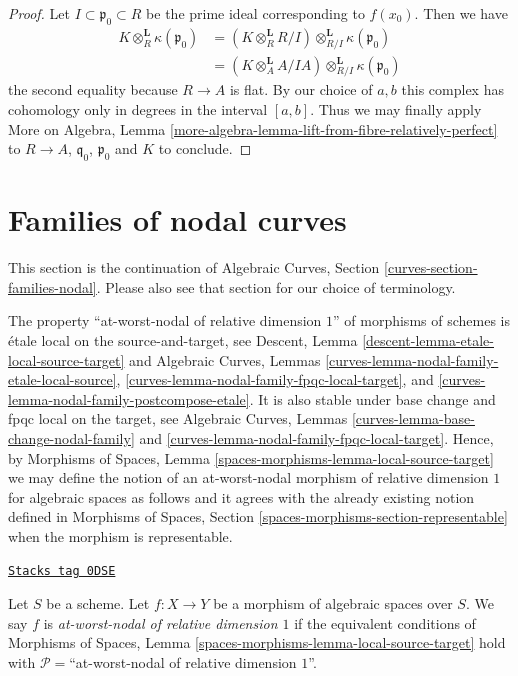 \begin{proof}
\medskip\noindent
Let $I \subset \mathfrak p_0 \subset R$ be the prime
ideal corresponding to $f(x_0)$. Then we have
\begin{align*}
K \otimes_R^\mathbf{L} \kappa(\mathfrak p_0)
& =
(K \otimes_R^\mathbf{L} R/I) \otimes_{R/I}^\mathbf{L}
\kappa(\mathfrak p_0) \\
& =
(K \otimes_A^\mathbf{L} A/IA) \otimes_{R/I}^\mathbf{L} \kappa(\mathfrak p_0)
\end{align*}
the second equality because $R \to A$ is flat.
By our choice of $a, b$ this complex has cohomology
only in degrees in the interval $[a, b]$.
Thus we may finally apply
More on Algebra, Lemma
\ref{more-algebra-lemma-lift-from-fibre-relatively-perfect}
to $R \to A$, $\mathfrak q_0$, $\mathfrak p_0$ and $K$
to conclude.
\end{proof}

\section{Families of nodal curves}
\label{spaces-more-morphisms-section-families-nodal}
This section is the continuation of
Algebraic Curves, Section \ref{curves-section-families-nodal}.
Please also see that section for our choice
of terminology.

\medskip\noindent
The property ``at-worst-nodal of relative dimension $1$''
of morphisms of schemes is \'etale local on the source-and-target, see
Descent, Lemma \ref{descent-lemma-etale-local-source-target}
and
Algebraic Curves, Lemmas \ref{curves-lemma-nodal-family-etale-local-source},
\ref{curves-lemma-nodal-family-fpqc-local-target}, and
\ref{curves-lemma-nodal-family-postcompose-etale}.
It is also stable under base change and fpqc local on the target, see
Algebraic Curves, Lemmas \ref{curves-lemma-base-change-nodal-family} and
\ref{curves-lemma-nodal-family-fpqc-local-target}. Hence, by
Morphisms of Spaces, Lemma \ref{spaces-morphisms-lemma-local-source-target}
we may define the notion of an at-worst-nodal morphism of relative
dimension $1$ for algebraic spaces as follows and it agrees with the
already existing notion defined in
Morphisms of Spaces, Section \ref{spaces-morphisms-section-representable}
when the morphism is representable.

\begin{definition}
\label{spaces-more-morphisms-definition-nodal-family}
\href{https://stacks.math.columbia.edu/tag/0DSE}{\texttt{Stacks tag 0DSE}}

Let $S$ be a scheme.
Let $f : X \to Y$ be a morphism of algebraic spaces over $S$.
We say $f$ is {\it at-worst-nodal of relative dimension $1$}
if the equivalent conditions of
Morphisms of Spaces, Lemma \ref{spaces-morphisms-lemma-local-source-target}
hold with $\mathcal{P} =$``at-worst-nodal of relative dimension $1$''.
\end{definition}


